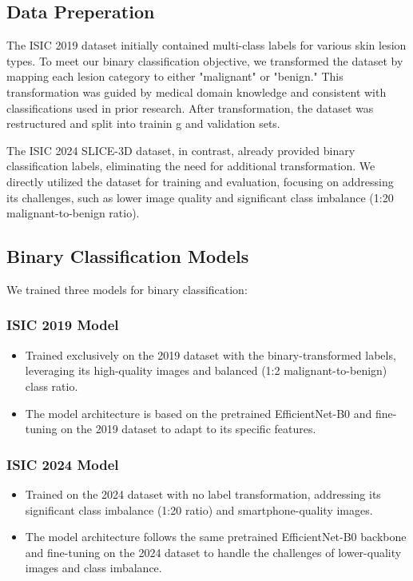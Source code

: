 \documentclass{article}
\begin{document}
\subsection{Data Preperation}

The ISIC 2019 dataset initially contained multi-class labels for various skin lesion types. To meet our binary
classification objective, we transformed the dataset by mapping each lesion category to either "malignant" or
"benign." This transformation was guided by medical domain knowledge and consistent with classifications used
in prior research. After transformation, the dataset was restructured and split into trainin g and validation sets.

The ISIC 2024 SLICE-3D dataset, in contrast, already provided binary classification labels, eliminating the need
for additional transformation. We directly utilized the dataset for training and evaluation, focusing on addressing
its challenges, such as lower image quality and significant class imbalance (1:20 malignant-to-benign ratio).

\subsection{Binary Classification Models}

We trained three models for binary classification:

\subsubsection{ISIC 2019 Model}

\begin{itemize}

\item Trained exclusively on the 2019 dataset with the binary-transformed labels, leveraging its high-quality
images and balanced (1:2 malignant-to-benign) class ratio.
\item The model architecture is based on the pretrained EfficientNet-B0 and fine-tuning on the 2019 dataset
to adapt to its specific features.

\end{itemize}

\subsubsection{ISIC 2024 Model}

\begin{itemize}

\item Trained on the 2024 dataset with no label transformation, addressing its significant class imbalance
(1:20 ratio) and smartphone-quality images.
\item The model architecture follows the same pretrained EfficientNet-B0 backbone and fine-tuning on the
2024 dataset to handle the challenges of lower-quality images and class imbalance.

\end{itemize}
\end{document}
